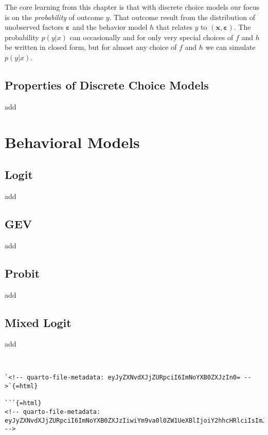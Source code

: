 \documentclass[
  letterpaper,
  DIV=11,
  numbers=noendperiod]{scrreprt}
\begin{document}
The core learning from this chapter is that with discrete choice models
our focus is on the \emph{probability} of outcome \(y\). That outcome
result from the distribution of unobserved factors
\(\boldsymbol{\varepsilon}\) and the behavior model \(h\) that relates
\(y\) to \((\mathbf{x}, \boldsymbol{\varepsilon})\). The probability
\(p(y|x)\) can occasionally and for only very special choices of \(f\)
and \(h\) be written in closed form, but for almost any choice of \(f\)
and \(h\) we can simulate \(p(y|x)\).

\chapter{Properties of Discrete Choice Models}\label{sec-properties}

add

\part{Behavioral Models}

\chapter{Logit}\label{sec-logit}

add

\chapter{GEV}\label{sec-gev}

add

\chapter{Probit}\label{sec-probit}

add

\chapter{Mixed Logit}\label{sec-mixedlogit}

add

\begin{verbatim}


`<!-- quarto-file-metadata: eyJyZXNvdXJjZURpciI6ImNoYXB0ZXJzIn0= -->`{=html}

```{=html}
<!-- quarto-file-metadata: eyJyZXNvdXJjZURpciI6ImNoYXB0ZXJzIiwiYm9va0l0ZW1UeXBlIjoiY2hhcHRlciIsImJvb2tJdGVtTnVtYmVyIjo3LCJib29rSXRlbUZpbGUiOiJjaGFwdGVycy8wN192YXJpYXRpb25zLnFtZCIsImJvb2tJdGVtRGVwdGgiOjF9 -->
\end{verbatim}
\end{document}
